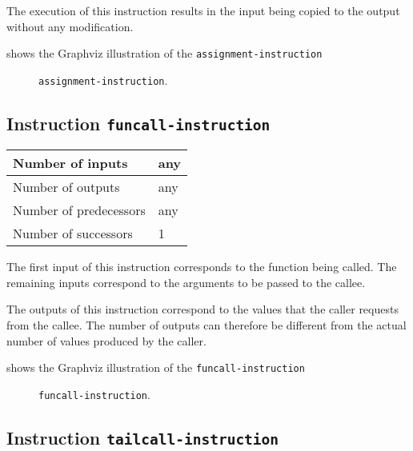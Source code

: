 The execution of this instruction results in the input being copied to
the output without any modification. 

 shows the Graphviz illustration of the
\texttt{assignment-instruction}

\begin{figure}
\begin{center}
\end{center}
\caption{\label{fig-assignment-instruction}
\texttt{assignment-instruction}.}
\end{figure}

\subsection{Instruction \texttt{funcall-instruction}}
\label{mir-instruction-funcall}

\begin{tabular}{|l|l|}
\hline
Number of inputs & any\\
\hline
Number of outputs & any\\
\hline
Number of predecessors & any\\
\hline
Number of successors & 1\\
\hline
\end{tabular}

The first input of this instruction corresponds to the function being
called.  The remaining inputs correspond to the arguments to be passed
to the callee.

The outputs of this instruction correspond to the values that the
caller requests from the callee.  The number of outputs can therefore
be different from the actual number of values produced by the caller.

 shows the Graphviz illustration of the
\texttt{funcall-instruction}

\begin{figure}
\begin{center}
\end{center}
\caption{\label{fig-funcall-instruction}
\texttt{funcall-instruction}.}
\end{figure}

\subsection{Instruction \texttt{tailcall-instruction}}
\label{mir-instruction-tailcall}

